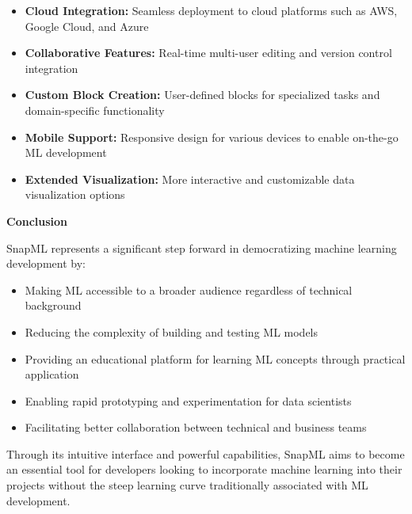 \documentclass[a0paper,portrait]{article}
\newcommand{\compresslist}{%
\setlength{\itemsep}{0pt}%
\setlength{\parskip}{0pt}%
\setlength{\parsep}{0pt}%
}
\begin{document}
\begin{multicols}{2}
\begin{itemize}
    \item \textbf{Cloud Integration:} Seamless deployment to cloud platforms such as AWS, Google Cloud, and Azure
    
    \item \textbf{Collaborative Features:} Real-time multi-user editing and version control integration
    
    \item \textbf{Custom Block Creation:} User-defined blocks for specialized tasks and domain-specific functionality
    
    \item \textbf{Mobile Support:} Responsive design for various devices to enable on-the-go ML development
    
    \item \textbf{Extended Visualization:} More interactive and customizable data visualization options
\end{itemize}

\textbf{Conclusion}

SnapML represents a significant step forward in democratizing machine learning development by:

\begin{itemize}\compresslist
    \item Making ML accessible to a broader audience regardless of technical background
    
    \item Reducing the complexity of building and testing ML models
    
    \item Providing an educational platform for learning ML concepts through practical application
    
    \item Enabling rapid prototyping and experimentation for data scientists
    
    \item Facilitating better collaboration between technical and business teams
\end{itemize}

Through its intuitive interface and powerful capabilities, SnapML aims to become an essential tool for developers looking to incorporate machine learning into their projects without the steep learning curve traditionally associated with ML development.

\end{multicols}
\end{document}
